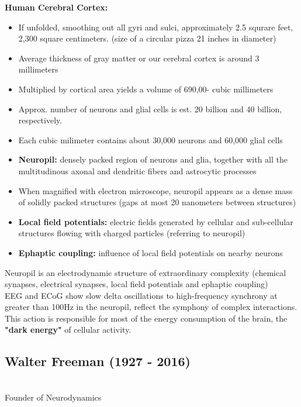 \documentclass{article}
\begin{document}
\noindent \textbf{Human Cerebral Cortex:}
\begin{itemize}
    \item If unfolded, smoothing out all gyri and sulci, approximately 2.5 squrare feet, 2,300 square centimeters. (size of a circular pizza 21 inches in diameter)
    \item Average thickness of gray matter or our cerebral cortex is around 3 millimeters
    \item Multiplied by cortical area yields a volume of 690,00- cubic millimeters
    \item Approx. number of neurons and glial cells is est. 20 billion and 40 billion, respectively. 
    \item Each cubic milimeter contains about 30,000 neurons and 60,000 glial cells
    \item \textbf{Neuropil:} densely packed region of neurons and glia, together with all the multitudinous axonal and dendritic fibers and astrocytic processes
    \item When magnified with electron microscope, neuropil appears as a dense mass of solidly packed structures (gaps at most 20 nanometers between structures)
    \item \textbf{Local field potentials:} electric fields generated by cellular and sub-cellular structures flowing with charged particles (referring to neuropil)
    \item \textbf{Ephaptic coupling:} influence of local field potentials on nearby neurons
\end{itemize}

Neuropil is an electrodynamic structure of extraordinary complexity (chemical synapses, electrical synapses, local field potentials and ephaptic coupling) \\

EEG  and ECoG show slow delta oscillations to high-frequency synchrony at greater than 100Hz in the neuropil, reflect the symphony of complex interactions. This action is responsible for most of the energy consumption of the brain, the \textbf{"dark energy"} of cellular activity. \\

\subsection{Walter Freeman (1927 - 2016)}\\
Founder of Neurodynamics \\
\end{document}
